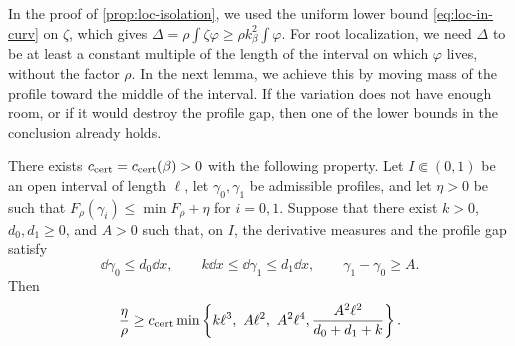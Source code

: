 In the proof of \cref{prop:loc-isolation}, we used the uniform lower bound
\eqref{eq:loc-in-curv} on $\zeta$, which gives
$\Delta=\rho\int\zeta\varphi\ge\rho k_\beta^2\int\varphi$. For root
localization, we need $\Delta$ to be at least a constant multiple of the length
of the interval on which $\varphi$ lives, without the factor $\rho$. In the
next lemma, we achieve this by moving mass of the profile toward the middle of
the interval. If the variation does not have enough room, or if it would
destroy the profile gap, then one of the lower bounds in the conclusion already
holds.

\begin{lemma}\label{lem:lz-certificate}
There exists $c_{\rm cert}=c_{\rm cert}(\beta)>0$ with the following property.
Let $I\Subset(0,1)$ be an open interval of length $\ell$, let
$\gamma_0,\gamma_1$ be admissible profiles, and let $\eta>0$ be such that
$F_\rho(\gamma_i)\le\min F_\rho+\eta$ for $i=0,1$. Suppose that there exist
$k>0$, $d_0,d_1\ge0$, and $A>0$ such that, on $I$, the derivative measures and
the profile gap satisfy
\[
 \dd\gamma_0\le d_0\dd x,\qquad
 k\dd x\le\dd\gamma_1\le d_1\dd x,
 \qquad \gamma_1-\gamma_0\ge A .
\]
Then
\begin{equation}\label{eq:lz-certificate}
 \frac\eta\rho\ge c_{\rm cert}\min\left\{
 k\ell^3,\ A\ell^2,\ A^2\ell^4,
                  \frac{A^2\ell^2}{d_0+d_1+k}\right\}.
\end{equation}
\end{lemma}

